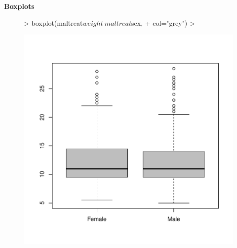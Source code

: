 \documentclass[xcolor=dvipsnames]{beamer}
\begin{document}
\begin{frame}[fragile]{\textbf{Boxplots}}
\begin{center}
\begin{figure}
\centering
\begin{Schunk}
\begin{Sinput}
> boxplot(maltreat$weight~maltreat$sex, 
+         col="grey")
> 
\end{Sinput}
\end{Schunk}
\includegraphics{lesson3_graphs_presentation-003}
\end{figure}
\end{center}


\end{frame}
\end{document}
